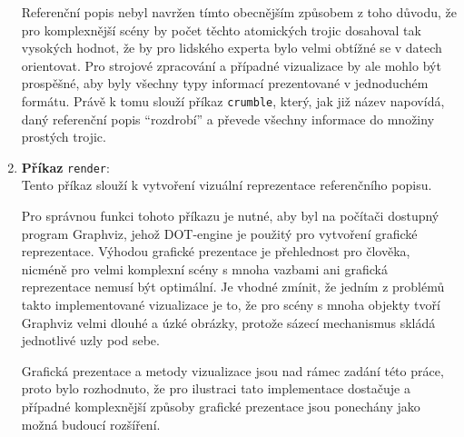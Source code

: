 \begin{enumerate}
	      Referenční popis nebyl navržen tímto obecnějším způsobem z toho důvodu, že pro komplexnější scény by počet těchto atomických trojic dosahoval tak vysokých hodnot,
	      že by pro lidského experta bylo velmi obtížné se v datech orientovat.
	      Pro strojové zpracování a případné vizualizace by ale mohlo být prospěšné, aby byly všechny typy informací prezentované v jednoduchém formátu.
	      Právě k tomu slouží příkaz \texttt{crumble}, který, jak již název napovídá, daný referenční popis \enquote{rozdrobí} a převede všechny informace do množiny prostých trojic.
	\item \textbf{Příkaz} \texttt{render}: \\
	      Tento příkaz slouží k vytvoření vizuální reprezentace referenčního popisu.

	      Pro správnou funkci tohoto příkazu je nutné, aby byl na počítači dostupný program Graphviz,
	      jehož DOT-engine je použitý pro vytvoření grafické reprezentace.
	      Výhodou grafické prezentace je přehlednost pro člověka, nicméně pro velmi komplexní scény s mnoha vazbami ani grafická reprezentace nemusí být optimální.
	      Je vhodné zmínit, že jedním z problémů takto implementované vizualizace je to, že pro scény s mnoha objekty tvoří Graphviz velmi dlouhé a úzké obrázky,
	      protože sázecí mechanismus skládá jednotlivé uzly pod sebe.

	      Grafická prezentace a metody vizualizace jsou nad rámec zadání této práce, proto bylo rozhodnuto, že pro ilustraci tato implementace dostačuje a případné komplexnější
	      způsoby grafické prezentace jsou ponechány jako možná budoucí rozšíření.
\end{enumerate}
